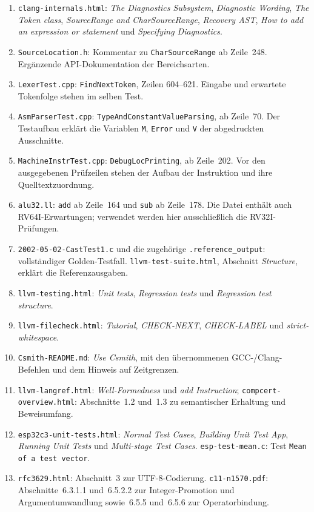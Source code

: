 \documentclass[11pt,a4paper]{article}
\newcommand{\code}[1]{\texttt{#1}}
\begin{document}
\begin{enumerate}
\item \code{clang-internals.html}: \emph{The Diagnostics Subsystem}, \emph{Diagnostic Wording}, \emph{The Token class}, \emph{SourceRange and CharSourceRange}, \emph{Recovery AST}, \emph{How to add an expression or statement} und \emph{Specifying Diagnostics}.
\item \code{SourceLocation.h}: Kommentar zu \code{CharSourceRange} ab Zeile~248. Ergänzende API-Dokumentation der Bereichsarten.
\item \code{LexerTest.cpp}: \code{FindNextToken}, Zeilen 604--621. Eingabe und erwartete Tokenfolge stehen im selben Test.
\item \code{AsmParserTest.cpp}: \code{TypeAndConstantValueParsing}, ab Zeile~70. Der Testaufbau erklärt die Variablen \code{M}, \code{Error} und \code{V} der abgedruckten Ausschnitte.
\item \code{MachineInstrTest.cpp}: \code{DebugLocPrinting}, ab Zeile~202. Vor den ausgegebenen Prüfzeilen stehen der Aufbau der Instruktion und ihre Quelltextzuordnung.
\item \code{alu32.ll}: \code{add} ab Zeile~164 und \code{sub} ab Zeile~178. Die Datei enthält auch RV64I-Erwartungen; verwendet werden hier ausschlie\ss{}lich die RV32I-Prüfungen.
\item \code{2002-05-02-CastTest1.c} und die zugehörige \code{.reference\_output}: vollständiger Golden-Testfall. \code{llvm-test-suite.html}, Abschnitt \emph{Structure}, erklärt die Referenzausgaben.
\item \code{llvm-testing.html}: \emph{Unit tests}, \emph{Regression tests} und \emph{Regression test structure}.
\item \code{llvm-filecheck.html}: \emph{Tutorial}, \emph{CHECK-NEXT}, \emph{CHECK-LABEL} und \emph{strict-whitespace}.
\item \code{Csmith-README.md}: \emph{Use Csmith}, mit den übernommenen GCC-/Clang-Befehlen und dem Hinweis auf Zeitgrenzen.
\item \code{llvm-langref.html}: \emph{Well-Formedness} und \emph{add Instruction}; \code{compcert-overview.html}: Abschnitte~1.2 und~1.3 zu semantischer Erhaltung und Beweisumfang.
\item \code{esp32c3-unit-tests.html}: \emph{Normal Test Cases}, \emph{Building Unit Test App}, \emph{Running Unit Tests} und \emph{Multi-stage Test Cases}. \code{esp-test-mean.c}: Test \code{Mean of a test vector}.
\item \code{rfc3629.html}: Abschnitt~3 zur UTF-8-Codierung. \code{c11-n1570.pdf}: Abschnitte~6.3.1.1 und~6.5.2.2 zur Integer-Promotion und Argumentumwandlung sowie~6.5.5 und~6.5.6 zur Operatorbindung.
\end{enumerate}
\end{document}
